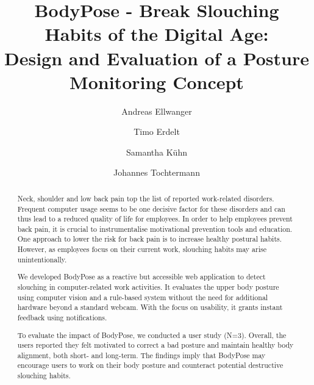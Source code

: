 \documentclass[sigconf, screen]{acmart}
\begin{document}
\title[BodyPose - Break Slouching Habits of the Digital Age]{BodyPose - Break Slouching Habits of the Digital Age:\\Design and Evaluation of a Posture Monitoring Concept}

\author{Andreas Ellwanger}
\author{Timo Erdelt}
\author{Samantha Kühn}
\author{Johannes Tochtermann}

\begin{abstract}
Neck, shoulder and low back pain top the list of reported work-related disorders. Frequent computer usage seems to be one decisive factor for these disorders and can thus lead to a reduced quality of life for employees.
In order to help employees prevent back pain, it is crucial to instrumentalise motivational prevention tools and education.
One approach to lower the risk for back pain is to increase healthy postural habits.
However, as employees focus on their current work, slouching habits may arise unintentionally.

We developed BodyPose as a reactive but accessible web application to detect slouching in computer-related work activities. It evaluates the upper body posture using computer vision and a rule-based system without the need for additional hardware beyond a standard webcam. With the focus on usability, it grants instant feedback using notifications. 

To evaluate the impact of BodyPose, we conducted a user study (N=3). Overall, the users reported they felt motivated to correct a bad posture and maintain healthy body alignment, both short- and long-term.
The findings imply that BodyPose may encourage users to work on their body posture and counteract potential destructive slouching habits.
\end{abstract}


\maketitle





\end{document}
